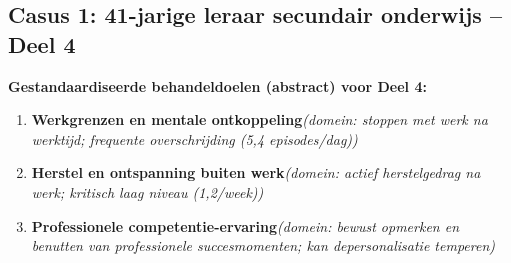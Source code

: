 \documentclass[11pt,a4paper]{article}
\begin{document}
\newpage
\subsection*{Casus 1: 41-jarige leraar secundair onderwijs -- Deel 4}

\begin{contextbox}
\small\textbf{Gestandaardiseerde behandeldoelen (abstract) voor Deel 4:}
\begin{enumerate}[topsep=2pt,itemsep=1pt,label=\arabic*.]
\item \textbf{Werkgrenzen en mentale ontkoppeling}\quad\textit{\small (domein: stoppen met werk na werktijd; frequente overschrijding (5,4 episodes/dag))}
\item \textbf{Herstel en ontspanning buiten werk}\quad\textit{\small (domein: actief herstelgedrag na werk; kritisch laag niveau (1,2/week))}
\item \textbf{Professionele competentie-ervaring}\quad\textit{\small (domein: bewust opmerken en benutten van professionele succesmomenten; kan depersonalisatie temperen)}
\end{enumerate}
\end{contextbox}
\end{document}
